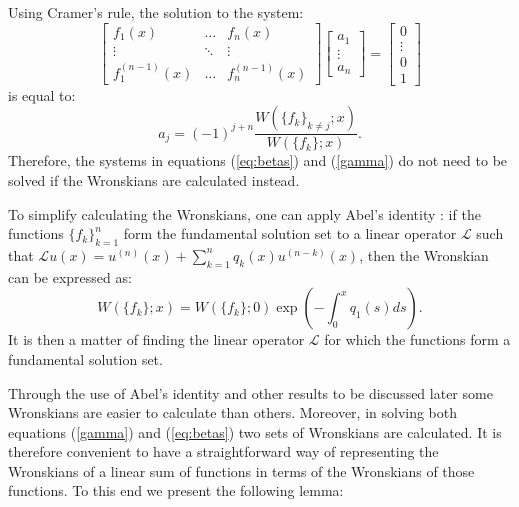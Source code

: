 \documentclass{article}
\begin{document}
Using Cramer's rule, the solution to the system:
\begin{equation}
\begin{bmatrix} f_1(x) & \dots & f_n(x) \\ \vdots & \ddots & \vdots \\ f^{(n-1)}_1(x) & \dots & f_n^{(n-1)}(x) \end{bmatrix} 
\begin{bmatrix} a_1 \\ \vdots \\ a_n \end{bmatrix} =
\begin{bmatrix} 0 \\ \vdots \\ 0 \\ 1 \end{bmatrix}
\end{equation}
is equal to:
\begin{equation} \label{eq:Wronskian coeffs}
a_j = (-1)^{j+n} \frac{ W( \{ f_k \}_{k \neq j} ; x) }{ W( \{ f_k \} ; x ) } .
\end{equation}
Therefore, the systems in equations (\ref{eq:betas}) and (\ref{gamma}) do not need to be solved if the Wronskians are calculated instead.


To simplify calculating the Wronskians, one can apply Abel's identity \cite{Abel, BoyceDiPrima}:
if the functions $\{ f_k \}_{k=1}^n$ form the fundamental solution set to a linear operator $\mathcal{L}$ such that 
$\mathcal{L} u(x) = u^{(n)}(x) + \sum_{k=1}^n q_k(x) u^{(n - k)}(x)$, then the Wronskian can be expressed as:
\begin{equation}
W(\{f_k\}; x) = W(\{f_k\}; 0) \exp \left ({ - \int_{0}^x q_1(s) ds } \right ).
\end{equation}
It is then a matter of finding the linear operator $\mathcal{L}$ for which the functions form a fundamental solution set.

Through the use of Abel's identity and other results to be discussed later some Wronskians are easier to calculate than others.
Moreover, in solving both equations (\ref{gamma}) and (\ref{eq:betas}) two sets of Wronskians are calculated.
It is therefore convenient to have a straightforward way of representing the Wronskians of a linear sum of functions in terms of the Wronskians of those functions.
To this end we present the following lemma:
\end{document}
